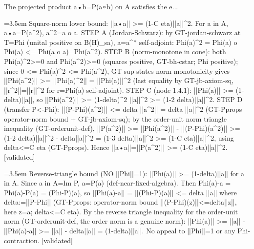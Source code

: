\documentclass{article}
\newcommand{\step}[1]{\par\noindent\hangindent=3.5em\hangafter=1%
  \makebox[3.5em][l]{\textbf{#1.}}}
\newcommand{\steptag}[1]{\hfill{\small\textsf{[#1]}}}
\begin{document}
\begin{proofbox}{The projected product a•b=P(a∘b) on A satisfies the e...}
\step{1.4} Square-norm lower bound: ||a•a|| >= (1-C eta)||a||\textasciicircum{}2. For a in A, a•a=P(a\textasciicircum{}2), a\textasciicircum{}2=a o a. STEP A (Jordan-Schwarz): by GT-jordan-schwarz at T=Phi (unital positive on B(H)\_sa), a=a\textasciicircum{}* self-adjoint: Phi(a)\textasciicircum{}2 = Phi(a) o Phi(a) <= Phi(a o a)=Phi(a\textasciicircum{}2). STEP B (norm-monotone in cone): both Phi(a)\textasciicircum{}2>=0 and Phi(a\textasciicircum{}2)>=0 (squares positive, GT-bh-cstar; Phi positive); since 0 <= Phi(a)\textasciicircum{}2 <= Phi(a\textasciicircum{}2), GT-sup-states norm-monotonicity gives ||Phi(a\textasciicircum{}2)|| >= ||Phi(a)\textasciicircum{}2|| = ||Phi(a)||\textasciicircum{}2 (last equality by GT-jb-axiom-sq, ||r\textasciicircum{}2||=||r||\textasciicircum{}2 for r=Phi(a) self-adjoint). STEP C (node 1.4.1): ||Phi(a)|| >= (1-delta)||a||, so ||Phi(a\textasciicircum{}2)|| >= (1-delta)\textasciicircum{}2 ||a||\textasciicircum{}2 >= (1-2 delta)||a||\textasciicircum{}2. STEP D (transfer P<-Phi): ||(P-Phi)(a\textasciicircum{}2)|| <= delta ||a\textasciicircum{}2|| = delta ||a||\textasciicircum{}2 (GT-Pprops operator-norm bound + GT-jb-axiom-sq); by the order-unit norm triangle inequality (GT-orderunit-def), ||P(a\textasciicircum{}2)|| >= ||Phi(a\textasciicircum{}2)|| - ||(P-Phi)(a\textasciicircum{}2)|| >= (1-2 delta)||a||\textasciicircum{}2 - delta||a||\textasciicircum{}2 = (1-3 delta)||a||\textasciicircum{}2 >= (1-C eta)||a||\textasciicircum{}2, using delta<=C eta (GT-Pprops). Hence ||a•a||=||P(a\textasciicircum{}2)|| >= (1-C eta)||a||\textasciicircum{}2. \steptag{validated} \\[6pt]
\step{1.4.1} Reverse-triangle bound (NO ||Phi||=1): ||Phi(a)|| >= (1-delta)||a|| for a in A. Since a in A=Im P, a=P(a) (def-near-fixed-algebra). Then Phi(a)-a = Phi(a)-P(a) = (Phi-P)(a), so ||Phi(a)-a|| = ||(Phi-P)(a)|| <= delta ||a|| where delta:=||P-Phi|| (GT-Pprops: operator-norm bound ||(P-Phi)(z)||<=delta||z||, here z=a; delta<=C eta). By the reverse triangle inequality for the order-unit norm (GT-orderunit-def, the order norm is a genuine norm): ||Phi(a)|| >= ||a|| - ||Phi(a)-a|| >= ||a|| - delta||a|| = (1-delta)||a||. No appeal to ||Phi||=1 or any Phi-contraction. \steptag{validated} \\[4pt]
\end{proofbox}
\end{document}
